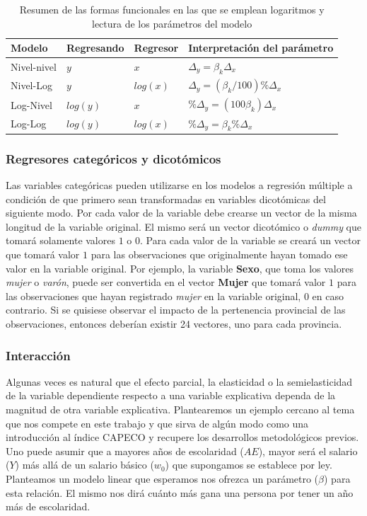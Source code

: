 \begin{table}[h!]
	\centering
	\caption{Resumen de las formas funcionales en las que se emplean logaritmos y lectura de los parámetros del modelo}
	\label{tab:table1}
	\begin{tabular}{l|l|l|l}
		Modelo & Regresando & Regresor & Interpretación del parámetro\\
		\hline
		Nivel-nivel & $y$ & $x$ & $\Delta_y = \beta_k \Delta_x$\\
		\hline
		Nivel-Log & $y$ & $log(x)$ & $\Delta_y = (\beta_k / 100)\% \Delta_x$\\
		\hline
		Log-Nivel & $log(y)$ & $x$ & $ \% \Delta_y = (100 \beta_k) \Delta_x$\\
		\hline
		Log-Log & $log(y)$ & $log(x)$ & $ \% \Delta_y = \beta_k \% \Delta_x$\\
				
	\end{tabular}
\end{table}



\subsubsection{Regresores categóricos y dicotómicos }

Las variables categóricas pueden utilizarse en los modelos a regresión múltiple a condición de que primero sean transformadas en variables dicotómicas del siguiente modo. Por cada valor de la variable debe crearse un vector de la misma longitud de la variable original. El mismo será un vector dicotómico o \textit{dummy} que tomará solamente valores $1$ o $0$. Para cada valor de la variable se creará un vector que tomará valor $1$ para las observaciones que originalmente hayan tomado ese valor en la variable original. Por ejemplo, la variable \textbf{Sexo}, que toma los valores \textit{mujer} o \textit{varón}, puede ser convertida en el vector \textbf{Mujer} que tomará valor $1$ para las observaciones que hayan registrado \textit{mujer} en la variable original, $0$ en caso contrario. Si se quisiese observar el impacto de la pertenencia provincial de las observaciones, entonces deberían existir 24 vectores, uno para cada provincia. 


\subsubsection{Interacción}
Algunas veces es natural que el efecto parcial, la elasticidad o la semielasticidad de la variable dependiente respecto a una variable explicativa dependa de la magnitud de otra variable explicativa. Plantearemos un ejemplo cercano al tema que nos compete en este trabajo y que sirva de algún modo como una introducción al índice CAPECO y recupere los desarrollos metodológicos previos. Uno puede asumir que a mayores años de escolaridad ($AE$), mayor será el salario ($Y$) más allá de un salario básico ($w_0$) que supongamos se establece por ley. Planteamos un modelo linear que esperamos nos ofrezca un parámetro ($\beta$) para esta relación. El mismo nos dirá cuánto más gana una persona por tener un año más de escolaridad. 


